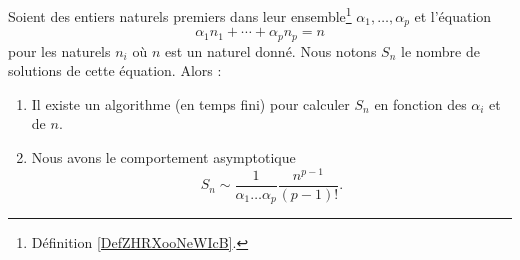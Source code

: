 \begin{theorem} \label{ThoDIDNooUrFFei}
    Soient des entiers naturels premiers dans leur ensemble\footnote{Définition \ref{DefZHRXooNeWIcB}.} \( \alpha_1,\ldots, \alpha_p\) et l'équation
    \begin{equation}
        \alpha_1n_1+\cdots +\alpha_pn_p=n
    \end{equation}
    pour les naturels \( n_i\) où \( n\) est un naturel donné. Nous notons \( S_n\) le nombre de solutions de cette équation. Alors :
    \begin{enumerate}
        \item
            Il existe un algorithme (en temps fini) pour calculer \( S_n\) en fonction des \( \alpha_i\) et de \( n\).
        \item
            Nous avons le comportement asymptotique
            \begin{equation}
                S_n\sim\frac{1}{ \alpha_1\ldots\alpha_p }\frac{ n^{p-1} }{ (p-1)! }.
            \end{equation}
    \end{enumerate}
\end{theorem}

